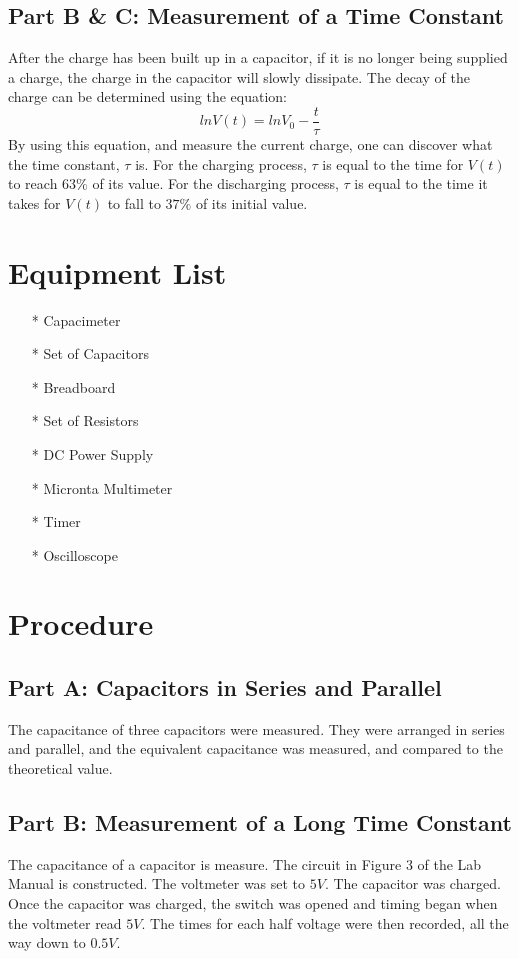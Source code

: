 \documentclass[titlepage]{article}
\begin{document}
\subsection{Part B \& C: Measurement of a Time Constant}\label{sub:part_b_c_measurement_of_a_time_constant}
After the charge has been built up in a capacitor, if it is no longer being supplied a charge, the charge in the capacitor will slowly dissipate. The decay of the charge can be determined using the equation:
\begin{equation}
	ln V(t) = ln V_0 - \frac{t}{\tau}
\end{equation}
By using this equation, and measure the current charge, one can discover what the time constant, $\tau$ is. For the charging process, $\tau$ is equal to the time for $V(t)$ to reach $63\%$ of its value. For the discharging process, $\tau$ is equal to the time it takes for $V(t)$ to fall to $37\%$ of its initial value.

\section{Equipment List}\label{sec:equipment_list}
\begin{itemize}
\item[*] Capacimeter
\item[*] Set of Capacitors
\item[*] Breadboard
\item[*] Set of Resistors
\item[*] DC Power Supply
\item[*] Micronta Multimeter
\item[*] Timer
\item[*] Oscilloscope
\end{itemize}

\section{Procedure}\label{sec:procedure}
\subsection{Part A: Capacitors in Series and Parallel}\label{sub:part_a_capacitors_in_series_and_parallel-proc}
The capacitance of three capacitors were measured. They were arranged in series and parallel, and the equivalent capacitance was measured, and compared to the theoretical value.

\subsection{Part B: Measurement of a Long Time Constant}\label{sub:part_b_measurement_of_a_long_time_constant-proc}
The capacitance of a capacitor is measure. The circuit in Figure 3 of the Lab Manual is constructed. The voltmeter was set to $5 V$. The capacitor was charged. Once the capacitor was charged, the switch was opened and timing began when the voltmeter read $5 V$. The times for each half voltage were then recorded, all the way down to $0.5 V$.
\end{document}
